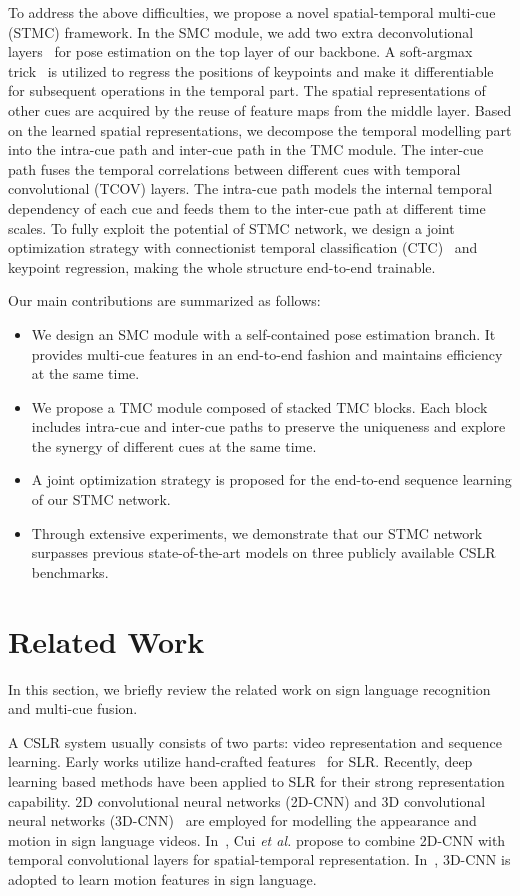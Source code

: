 \documentclass[letterpaper]{article} %
\begin{document}
To address the above difficulties, we propose a novel spatial-temporal multi-cue (STMC) framework. 
In the SMC module, we add two extra deconvolutional layers~\cite{deconv,xiao2018simple} for pose estimation on the top layer of our backbone. 
A soft-argmax trick~\cite{soft-argmax} is utilized to regress the positions of keypoints and make it differentiable for subsequent operations in the temporal part. 
The spatial representations of other cues are acquired by the reuse of feature maps from the middle layer. 
Based on the learned spatial representations, we decompose the temporal modelling part into the intra-cue path and inter-cue path in the TMC module. 
The inter-cue path fuses the temporal correlations between different cues with temporal convolutional (TCOV) layers. 
The intra-cue path models the internal temporal dependency of each cue and feeds them to the inter-cue path at different time scales.  
To fully exploit the potential of STMC network, we design a joint optimization strategy with connectionist temporal classification (CTC)~\cite{CTC} and keypoint regression, making the whole structure end-to-end trainable.


Our main contributions are summarized as follows:
\begin{itemize}
\item We design an SMC module with a self-contained pose estimation branch. It provides multi-cue features in an end-to-end fashion and maintains efficiency at the same time.
\item We propose a TMC module composed of stacked TMC blocks. Each block includes intra-cue and inter-cue paths to preserve the uniqueness and explore the synergy of different cues at the same time.
\item A joint optimization strategy is proposed for the end-to-end sequence learning of our STMC network. 
\item Through extensive experiments, we demonstrate that our STMC network surpasses previous state-of-the-art models on three publicly available CSLR benchmarks. 
\end{itemize}


\section{Related Work}
In this section, we briefly review the related work on sign language recognition and multi-cue fusion.

A CSLR system usually consists of two parts: video representation and sequence learning. Early works utilize 
hand-crafted features~\cite{cooper2009learning,buehler2009learning,yin2016iterative} for SLR. 
Recently, deep learning based methods have been applied to SLR for their strong representation capability. 2D 
convolutional neural networks (2D-CNN) and 3D convolutional neural networks (3D-CNN)~\cite{yukai3d,qiu2017learning-p3d} are employed for modelling the appearance and motion in sign language videos. In~\cite{staged}, Cui \textit{et al.} propose to combine 2D-CNN with temporal convolutional layers for spatial-temporal representation. In~\cite{molchanov2016online,dilated,zhou2019dynamic,wei2019bigmm}, 3D-CNN is adopted to learn motion features in sign language.
\end{document}
